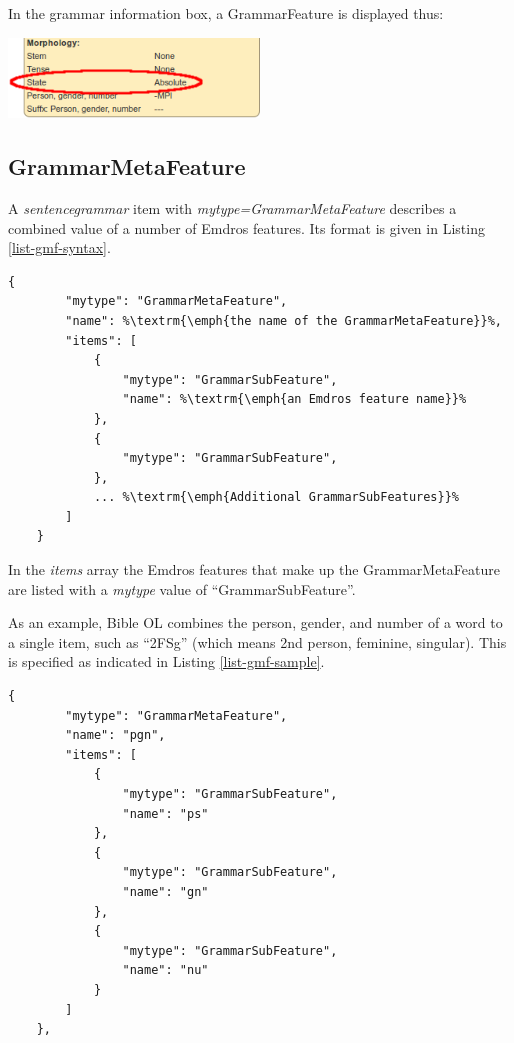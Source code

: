 \documentclass[11pt,oneside,a4paper]{memoir}
\begin{document}
\Needspace*{5cm}%
In the grammar information box, a GrammarFeature is displayed thus:

\begin{center}
  \includegraphics[width=0.5\textwidth]{state2.png}
\end{center}


\subsection{GrammarMetaFeature}\label{sec-grammarmetafeature}

A \emph{sentencegrammar} item with \emph{mytype=GrammarMetaFeature} describes a combined value of a
number of Emdros features. Its format is given in Listing \ref{list-gmf-syntax}.

\begin{lstlisting}[caption=GrammarMetaFeature syntax,label=list-gmf-syntax]
    {
        "mytype": "GrammarMetaFeature",
        "name": %\textrm{\emph{the name of the GrammarMetaFeature}}%,
        "items": [
            {
                "mytype": "GrammarSubFeature",
                "name": %\textrm{\emph{an Emdros feature name}}%
            },
            {
                "mytype": "GrammarSubFeature",
            },
            ... %\textrm{\emph{Additional GrammarSubFeatures}}%
        ]
    }
\end{lstlisting}

In the \emph{items} array the Emdros features that make up the GrammarMetaFeature are listed with a
\emph{mytype} value of ``GrammarSubFeature''.

As an example, Bible OL combines the person, gender, and number of a word to a single item, such as
``2FSg'' (which means 2nd person, feminine, singular). This is specified as indicated in Listing
\ref{list-gmf-sample}.

\begin{lstlisting}[caption={A GrammarMetaFeature combining person, gender, and number},label=list-gmf-sample]
    {
        "mytype": "GrammarMetaFeature",
        "name": "pgn",
        "items": [
            {
                "mytype": "GrammarSubFeature",
                "name": "ps"
            },
            {
                "mytype": "GrammarSubFeature",
                "name": "gn"
            },
            {
                "mytype": "GrammarSubFeature",
                "name": "nu"
            }
        ]
    },
\end{lstlisting}
\end{document}

